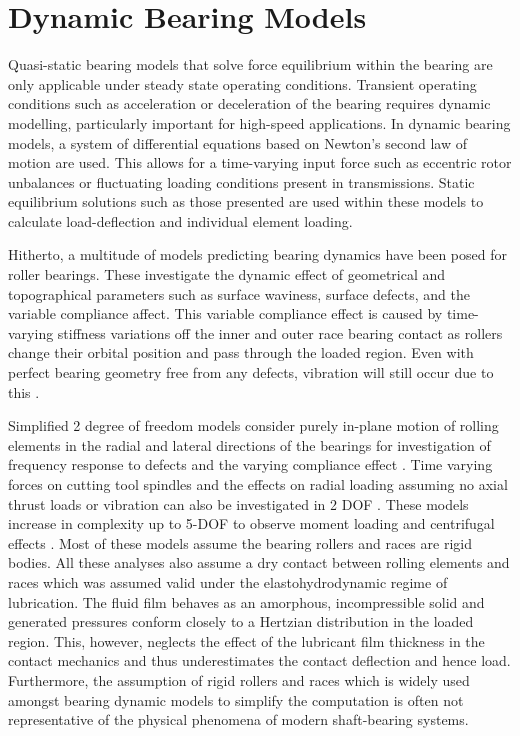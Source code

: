\section{Dynamic Bearing Models}

Quasi-static bearing models that solve force equilibrium within the bearing are only applicable under steady state operating conditions. Transient operating conditions such as acceleration or deceleration of the bearing requires dynamic modelling, particularly important for high-speed applications. In dynamic bearing models, a system of differential equations based on Newton’s second law of motion are used. This allows for a time-varying input force such as eccentric rotor unbalances or fluctuating loading conditions present in transmissions. Static equilibrium solutions such as those presented are used within these models to calculate load-deflection and individual element loading. 

Hitherto, a multitude of models predicting bearing dynamics have been posed for roller bearings. These investigate the dynamic effect of geometrical and topographical parameters such as surface waviness, surface defects, and the variable compliance affect. This variable compliance effect is caused by time-varying stiffness variations off the inner and outer race bearing contact as rollers change their orbital position and pass through the loaded region. Even with perfect bearing geometry free from any defects, vibration will still occur due to this \cite{Sopanen2003_1}.
  
Simplified 2 degree of freedom models \cite{Walters1971} consider purely in-plane motion of rolling elements in the radial and lateral directions of the bearings for investigation of frequency response to defects \cite{Meyer1980} and the varying compliance effect \cite{Sunnersjo1978}.  Time varying forces on cutting tool spindles and the effects on radial loading assuming no axial thrust loads or vibration can also be investigated in 2 DOF \cite{Matsubara1988}. These models increase in complexity up to 5-DOF  to observe moment loading and centrifugal effects \cite{Rahnejat2004} \cite{Gupta1979}. Most of these models assume the bearing rollers and races are rigid bodies. All these analyses also assume a dry contact between rolling elements and races which was assumed valid under the elastohydrodynamic regime of lubrication. The fluid film behaves as an amorphous, incompressible solid and generated pressures conform closely to a Hertzian distribution in the loaded region. This, however, neglects the effect of the lubricant film thickness in the contact mechanics and thus underestimates the contact deflection and hence load. Furthermore, the assumption of rigid rollers and races which is widely used amongst bearing dynamic models to simplify the computation is often not representative of the physical phenomena of modern shaft-bearing systems.

